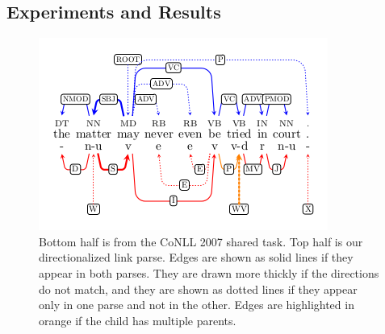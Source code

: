 \documentclass[a0,landscape]{a0poster}
\begin{document}
\begin{multicols}{4}
\section{Experiments and Results}

\begin{figure}
  \centering
  \includegraphics[width=0.6\linewidth]{example_parse.png}
  \caption*{Bottom half is from the CoNLL 2007 shared task. Top half is our directionalized link parse. Edges are shown as solid lines if they appear in both parses.  They are drawn more thickly if the directions do not match, and they are shown as dotted lines if they appear only in one parse and not in the other. Edges are highlighted in orange if the child has multiple parents.}
\end{figure}


\end{multicols}
\end{document}

